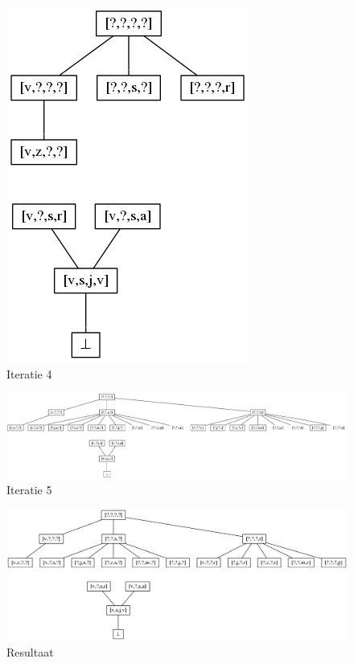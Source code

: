 \documentclass[alternative-exam.tex]{subfiles}
\begin{document}
\begin{figure}
[H]
\centering
\caption{Iteratie 4}
\label{iter_4}
\includegraphics[scale=0.5]{resources/graphs/iteration_4.png}
\end{figure}
\begin{figure}
\centering
\caption{Iteratie 5}
\label{iter_5}
\includegraphics[scale=0.35]{resources/graphs/iteration_5.png}
\end{figure}
\begin{figure}
\centering
\caption{Resultaat}
\label{resultaat}
\includegraphics[scale=0.5]{resources/graphs/resultaat.png}
\end{figure}
\end{document}

